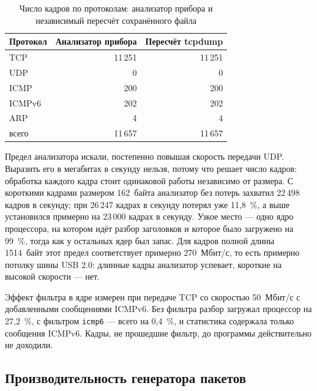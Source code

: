 \begin{table}[htbp]
    \caption{Число кадров по протоколам: анализатор прибора и независимый пересчёт сохранённого файла}
    \label{tab:presnost}
    \centering
    \begin{tabular}{lrr}
        \hline
        Протокол & Анализатор прибора & Пересчёт tcpdump \\
        \hline
        TCP & 11\,251 & 11\,251 \\
        UDP & 0 & 0 \\
        ICMP & 200 & 200 \\
        ICMPv6 & 202 & 202 \\
        ARP & 4 & 4 \\
        всего & 11\,657 & 11\,657 \\
        \hline
    \end{tabular}
\end{table}

Предел анализатора искали, постепенно повышая скорость передачи UDP. Выразить его в мегабитах в секунду нельзя, потому что решает число кадров: обработка каждого кадра стоит одинаковой работы независимо от размера. С короткими кадрами размером 162~байта анализатор без потерь захватил 22\,498 кадров в секунду; при 26\,247 кадрах в секунду потерял уже 11,8~\%, а выше установился примерно на 23\,000 кадрах в секунду. Узкое место — одно ядро процессора, на котором идёт разбор заголовков и которое было загружено на 99~\%, тогда как у остальных ядер был запас. Для кадров полной длины 1514~байт этот предел соответствует примерно 270~Мбит/с, то есть примерно потолку шины USB 2.0: длинные кадры анализатор успевает, короткие на высокой скорости — нет.

Эффект фильтра в ядре измерен при передаче TCP со скоростью 50~Мбит/с с добавленными сообщениями ICMPv6. Без фильтра разбор загружал процессор на 27,2~\%, с фильтром \texttt{icmp6} — всего на 0,4~\%, и статистика содержала только сообщения ICMPv6. Кадры, не прошедшие фильтр, до программы действительно не доходили.

\subsection{Производительность генератора пакетов}
\label{sec:overeni_generatoru}

